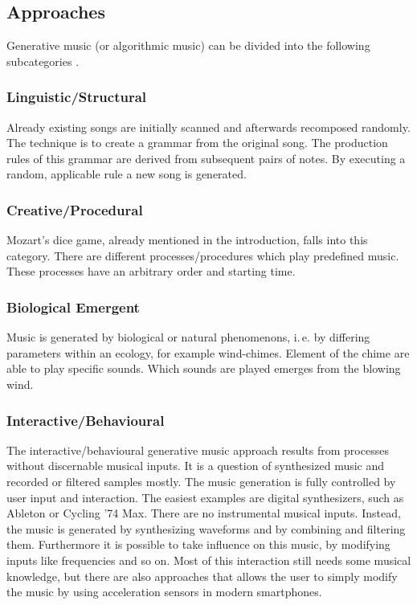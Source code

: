 	\subsection{Approaches} 

	Generative music (or algorithmic music) can be divided into the following subcategories \cite{Wooller2005}.

	\subsubsection{Linguistic/Structural}

	Already existing songs are initially scanned and afterwards recomposed randomly. 
	The technique is to create a grammar from the original song. The production rules of this grammar are derived from subsequent pairs of notes. By executing a random, applicable rule a new song is generated.

	\subsubsection{Creative/Procedural}

	Mozart's dice game, already mentioned in the introduction, falls into this category.
	There are different processes/procedures which play predefined music. These processes have an arbitrary order and starting time. 

	\subsubsection{Biological Emergent}

	Music is generated by biological or natural phenomenons, i.\,e. by differing parameters within an ecology, for example wind-chimes. Element of the chime are able to play specific sounds. Which sounds are played emerges from the blowing wind.

	\subsubsection{Interactive/Behavioural}

	The interactive/behavioural generative music approach results from processes without discernable musical inputs. It is a question of synthesized music and recorded or filtered samples mostly. The music generation is fully controlled by user input and interaction. 
	The easiest examples are digital synthesizers, such as Ableton or Cycling '74 Max. There are no instrumental musical inputs. Instead, the music is generated by synthesizing waveforms and by combining and filtering them. Furthermore it is possible to take influence on this music, by modifying inputs like frequencies and so on. Most of this interaction still needs some musical knowledge, but there are also approaches that allows the user to simply modify the music by using acceleration sensors in modern smartphones.
	
